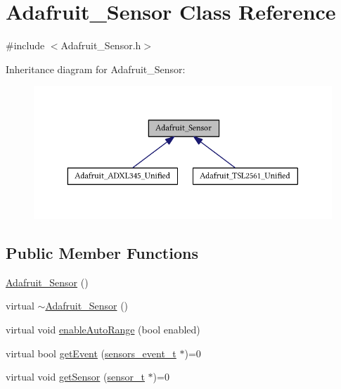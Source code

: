 \hypertarget{class_adafruit___sensor}{}\section{Adafruit\+\_\+\+Sensor Class Reference}
\label{class_adafruit___sensor}


{\ttfamily \#include $<$Adafruit\+\_\+\+Sensor.\+h$>$}



Inheritance diagram for Adafruit\+\_\+\+Sensor\+:\nopagebreak
\begin{figure}[H]
\begin{center}
\leavevmode
\includegraphics[width=350pt]{class_adafruit___sensor__inherit__graph}
\end{center}
\end{figure}
\subsection*{Public Member Functions}
\begin{DoxyCompactItemize}
\item 
\hyperlink{class_adafruit___sensor_a1d06c6f2b9d014894f47102fc1effddf}{Adafruit\+\_\+\+Sensor} ()
\item 
virtual \hyperlink{class_adafruit___sensor_ac98df73e0cd9367a226b96668417e2e6}{$\sim$\+Adafruit\+\_\+\+Sensor} ()
\item 
virtual void \hyperlink{class_adafruit___sensor_ace6c1f26eeb956f95801b9fc1841f3a0}{enable\+Auto\+Range} (bool enabled)
\item 
virtual bool \hyperlink{class_adafruit___sensor_a0636562b9bc853b796ecc87b5d4b1bec}{get\+Event} (\hyperlink{_adafruit___sensor_8h_structsensors__event__t}{sensors\+\_\+event\+\_\+t} $\ast$)=0
\item 
virtual void \hyperlink{class_adafruit___sensor_a19e844c1eb2dc37cb72705d5572c4676}{get\+Sensor} (\hyperlink{_adafruit___sensor_8h_structsensor__t}{sensor\+\_\+t} $\ast$)=0
\end{DoxyCompactItemize}


